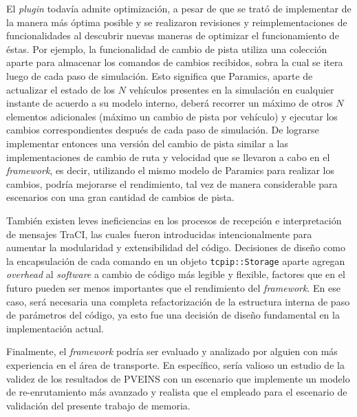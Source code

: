 El \emph{plugin} todavía admite optimización, a pesar de que se trató de implementar de la manera más óptima posible y se realizaron revisiones y reimplementaciones de funcionalidades al descubrir nuevas maneras de optimizar el funcionamiento de éstas. Por ejemplo, la funcionalidad de cambio de pista utiliza una colección aparte para almacenar los comandos de cambios recibidos, sobra la cual se itera luego de cada paso de simulación. 
Esto significa que Paramics, aparte de actualizar el estado de los $N$ vehículos presentes en la simulación en cualquier instante de acuerdo a su modelo interno, deberá recorrer un máximo de otros $N$ elementos adicionales (máximo un cambio de pista por vehículo) y ejecutar los cambios correspondientes después de cada paso de simulación.
De lograrse implementar entonces una versión del cambio de pista similar a las implementaciones de cambio de ruta y velocidad que se llevaron a cabo en el \emph{framework}, es decir, utilizando el mismo modelo de Paramics para realizar los cambios, podría mejorarse el rendimiento, tal vez de manera considerable para escenarios con una gran cantidad de cambios de pista. 

También existen leves ineficiencias en los procesos de recepción e interpretación de mensajes TraCI, las cuales fueron introducidas intencionalmente para aumentar la modularidad y extensibilidad del código. 
Decisiones de diseño como la encapsulación de cada comando en un objeto \texttt{tcpip::Storage} aparte agregan \emph{overhead} al \emph{software} a cambio de código más legible y flexible, factores que en el futuro pueden ser menos importantes que el rendimiento del \emph{framework}. En ese caso, será necesaria una completa refactorización de la estructura interna de paso de parámetros del código, ya esto fue una decisión de diseño fundamental en la implementación actual.

Finalmente, el \emph{framework} podría ser evaluado y analizado por alguien con más experiencia en el área de transporte. En específico, sería valioso un estudio de la validez de los resultados de PVEINS con un escenario que implemente un modelo de re-enrutamiento más avanzado y realista que el empleado para el escenario de validación del presente trabajo de memoria.